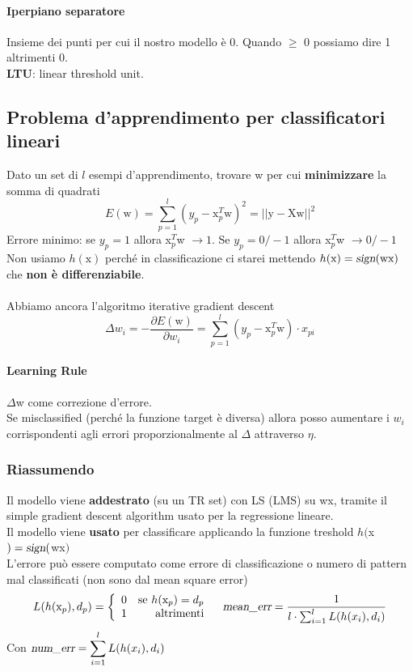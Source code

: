 \documentclass[10pt]{book}
\begin{document}
\paragraph{Iperpiano separatore} Insieme dei punti per cui il nostro modello è 0. Quando $\geq$ 0 possiamo dire 1 altrimenti 0.\\
\textbf{LTU}: linear threshold unit.
\pagebreak
\subsection{Problema d'apprendimento per classificatori lineari}
Dato un set di $l$ esempi d'apprendimento, trovare w per cui \textbf{minimizzare} la somma di quadrati $$E(\text{w}) = \sum_{p=1}^l (y_p - \text{x}_p^T\text{w})^2 = ||\text{y} - \text{Xw}||^2$$
Errore minimo: se $y_p = 1$ allora x$_p^T$w $\rightarrow 1$. Se $y_p = 0/-1$ allora x$_p^T$w $\rightarrow 0/-1$\\
Non usiamo $h(\text{x})$ perché in classificazione ci starei mettendo $h(\text{x}) = \textsl{sign}(\text{wx})$ che \textbf{non è differenziabile}.\\\\
Abbiamo ancora l'algoritmo iterative gradient descent
$$\Delta w_i = - \frac{\partial E(\text{w})}{\partial w_i} = \sum_{p=1}^l (y_p - \text{x}_p^T\text{w})\cdot x_{pi}$$
\paragraph{Learning Rule} $\Delta$w come correzione d'errore.\\
Se misclassified (perché la funzione target è diversa) allora posso aumentare i $w_i$ corrispondenti agli errori proporzionalmente al $\Delta$ attraverso $\eta$.
\subsubsection{Riassumendo}
Il modello viene \textbf{addestrato} (su un TR set) con LS (LMS) su wx, tramite il simple gradient descent algorithm usato per la regressione lineare.\\
Il modello viene \textbf{usato} per classificare applicando la funzione treshold $h($x$) = \textsl{sign}($wx$)$\\
L'errore può essere computato come errore di classificazione o numero di pattern mal classificati (non sono dal mean square error)
$$L(h(\text{x}_p), d_p) =
\left\{ \begin{array}{l r}
0 & \text{se }h(\text{x}_p) = d_p\\
1 & \text{altrimenti}
\end{array} \right.
\:\:\:\:
\textsl{mean\_err} =
\frac{1}{l\cdot
\sum_{i=1}^l L(h(x_i), d_i)}$$
Con $\textsl{num\_err} = \mathlarger{\sum_{i=1}^l L(h(x_i), d_i)}$
\end{document}
